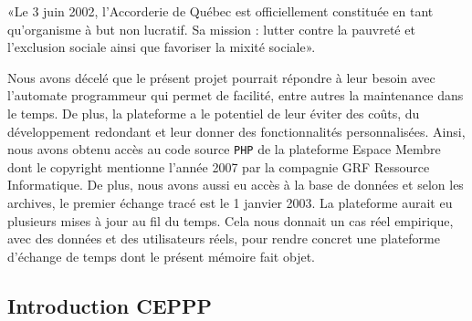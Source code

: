 



«Le 3 juin 2002, l’Accorderie de Québec est officiellement constituée en tant qu’organisme à but non lucratif. Sa mission : lutter contre la pauvreté et l’exclusion sociale ainsi que favoriser la mixité sociale»\cite{erudit_accorderie_2014}. 

Nous avons décelé que le présent projet pourrait répondre à leur besoin avec l'automate programmeur qui permet de facilité, entre autres la maintenance dans le temps. De plus, la plateforme a le potentiel de leur éviter des coûts, du développement redondant et leur donner des fonctionnalités personnalisées. Ainsi, nous avons obtenu accès au code source \texttt{PHP} de la plateforme Espace Membre dont le copyright mentionne l’année 2007 par la compagnie GRF Ressource Informatique. De plus, nous avons aussi eu accès à la base de données et selon les archives, le premier échange tracé est le 1 janvier 2003. La plateforme aurait eu plusieurs mises à jour au fil du temps. Cela nous donnait un cas réel empirique, avec des données et des utilisateurs réels, pour rendre concret une plateforme d'échange de temps dont le présent mémoire fait objet.

\subsection{Introduction CEPPP}

